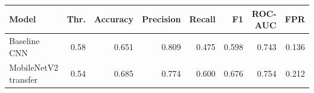 \begin{tabular}{lrrrrrrr}
\toprule
\textbf{Model} & \textbf{Thr.} & \textbf{Accuracy} & \textbf{Precision} & \textbf{Recall} & \textbf{F1} & \textbf{ROC-AUC} & \textbf{FPR} \\
\midrule
Baseline CNN & 0.58 & 0.651 & 0.809 & 0.475 & 0.598 & 0.743 & 0.136 \\
MobileNetV2 transfer & 0.54 & 0.685 & 0.774 & 0.600 & 0.676 & 0.754 & 0.212 \\
\bottomrule
\end{tabular}
